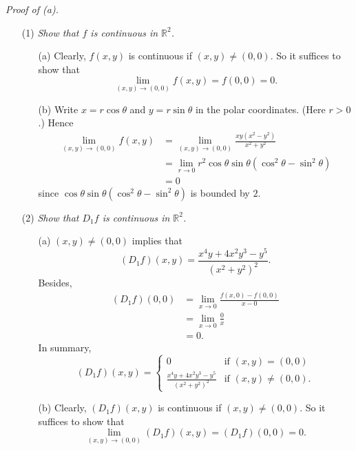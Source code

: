 \documentclass{article}
\begin{document}
\emph{Proof of (a).}
\begin{enumerate}
\item[(1)]
  \emph{Show that $f$ is continuous in $\mathbb{R}^2$.}
  \begin{enumerate}
  \item[(a)]
    Clearly, $f(x,y)$ is continuous if $(x,y) \neq (0,0)$.
    So it suffices to show that
    \[
      \lim_{(x,y) \to (0,0)} f(x,y) = f(0,0) = 0.
    \]

  \item[(b)]
    Write $x = r\cos\theta$ and $y = r\sin\theta$ in the polar coordinates.
    (Here $r > 0$.)
    Hence
    \begin{align*}
      \lim_{(x,y) \to (0,0)} f(x,y)
      &= \lim_{(x,y) \to (0,0)} \frac{xy(x^2-y^2)}{x^2+y^2} \\
      &= \lim_{r \to 0} r^2 \cos\theta\sin\theta(\cos^2\theta-\sin^2\theta) \\
      &= 0
    \end{align*}
    since $\cos\theta\sin\theta(\cos^2\theta-\sin^2\theta)$ is bounded by $2$.
  \end{enumerate}

\item[(2)]
  \emph{Show that $D_1 f$ is continuous in $\mathbb{R}^2$.}
  \begin{enumerate}
  \item[(a)]
    $(x,y) \neq (0,0)$ implies that
    \[
      (D_1 f)(x,y) = \frac{x^4y+4x^2y^3-y^5}{(x^2+y^2)^2}.
    \]
    Besides,
    \begin{align*}
      (D_1 f)(0,0)
      &= \lim_{x \to 0} \frac{f(x,0) - f(0,0)}{x - 0} \\
      &= \lim_{x \to 0} \frac{0}{x} \\
      &= 0.
    \end{align*}
    In summary,
    \begin{equation*}
      (D_{1} f)(x,y) =
      \begin{cases}
        0
          & \text{if $(x,y) = (0,0)$} \\
        \frac{x^4y+4x^2y^3-y^5}{(x^2+y^2)^2}
          & \text{if $(x,y) \neq (0,0)$}.
      \end{cases}
    \end{equation*}

  \item[(b)]
    Clearly, $(D_1 f)(x,y)$ is continuous if $(x,y) \neq (0,0)$.
    So it suffices to show that
    \[
      \lim_{(x,y) \to (0,0)} (D_1 f)(x,y) = (D_1 f)(0,0) = 0.
    \]


\end{enumerate}
\end{enumerate}
\end{document}
